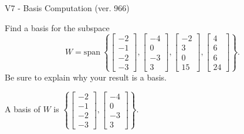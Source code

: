 \begin{exercise}
  \begin{exerciseTitle}V7 - Basis Computation (ver. 966)\end{exerciseTitle}
  \begin{exerciseStatement}
    Find a basis for the subspace 
\[W=\mathrm{span}\ \left\{\left[\begin{array}{r}
-2 \\
-1 \\
-2 \\
-3
\end{array}\right] , \left[\begin{array}{r}
-4 \\
0 \\
-3 \\
3
\end{array}\right] , \left[\begin{array}{r}
-2 \\
3 \\
0 \\
15
\end{array}\right] , \left[\begin{array}{r}
4 \\
6 \\
6 \\
24
\end{array}\right]\right\}.\]
 Be sure to explain why your result is a basis.


  \end{exerciseStatement}
  \begin{exerciseAnswer}
   A basis of \(W\) is  \(\left\{\left[\begin{array}{r}
-2 \\
-1 \\
-2 \\
-3
\end{array}\right] , \left[\begin{array}{r}
-4 \\
0 \\
-3 \\
3
\end{array}\right]\right\}\).
  


  \end{exerciseAnswer}
\end{exercise}